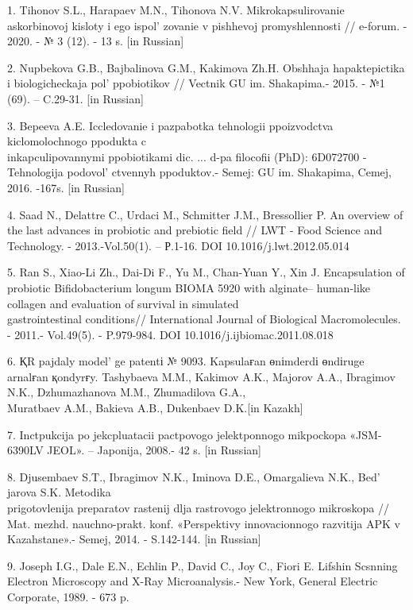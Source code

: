 \begin{references}
1. Tihonov S.L., Harapaev M.N., Tihonova N.V. Mikrokapsulirovanie
askorbinovoj kisloty i ego ispol' zovanie v pishhevoj
promyshlennosti // e-forum. - 2020. - № 3 (12). - 13 s. {[}in Russian{]}

2. Nupbekova G.B., Bajbalinova G.M., Kakimova Zh.H. Obshhaja
hapaktepictika i biologicheckaja pol'{} ppobiotikov //
Vectnik GU im. Shakapima.- 2015. - №1 (69). -- C.29-31. {[}in
Russian{]}

3. Bepeeva A.E. Iccledovanie i pazpabotka tehnologii ppoizvodctva
kiclomolochnogo ppodukta c \\inkapculipovannymi ppobiotikami dic. ... d-pa
filocofii (PhD): 6D072700 - Tehnologija podovol' ctvennyh
ppoduktov.- Semej: GU im. Shakapima, Cemej, 2016. -167s. {[}in
Russian{]}

4. Saad N., Delattre C., Urdaci M., Schmitter J.M., Bressollier P. An
overview of the last advances in probiotic and prebiotic field // LWT -
Food Science and Technology. - 2013.-Vol.50(1). -- Р.1-16. DOI
10.1016/j.lwt.2012.05.014

5. Ran S., Xiao-Li Zh., Dai-Di F., Yu M., Chan-Yuan Y., Xin J.
Encapsulation of probiotic Bifidobacterium longum BIOMA 5920 with
alginate-- human-like collagen and evaluation of survival in simulated\\
gastrointestinal conditions// International Journal of Biological
Macromolecules. - 2011.- Vol.49(5). - P.979-984. DOI 10.1016/j.ijbiomac.2011.08.018

6. ҚR pajdaly model' ge patentі № 9093. Kapsulaғan
өnіmderdі өndіruge arnalғan қondyrғy. Tashybaeva M.M., Kakimov A.K.,
Majorov A.A., Ibragimov N.K., Dzhumazhanova M.M., Zhumadilova G.A.,\\
Muratbaev A.M., Bakieva A.B., Dukenbaev D.K.{[}in Kazakh{]}

7. Inctpukcija po jekcpluatacii pactpovogo jelektponnogo mikpockopa
«JSM-6390LV JEOL». -- Japonija, 2008.- 42 s. {[}in Russian{]}

8. Djusembaev S.T., Ibragimov N.K., Iminova D.E., Omargalieva N.K.,
Bed' jarova S.K. Metodika \\prigotovlenija preparatov
rastenij dlja rastrovogo jelektronnogo mikroskopa // Mat. mezhd.
nauchno-prakt. konf. «Perspektivy innovacionnogo razvitija APK v
Kazahstane».- Semej, 2014. - S.142-144. {[}in Russian{]}

9. Joseph I.G., Dale E.N., Echlin P., David C., Joy C., Fiori E. Lifshin
Scsnning Electron Microscopy and X-Ray Microanalysis.- New York, General
Electric Corporate, 1989. - 673 p.


\end{references}
